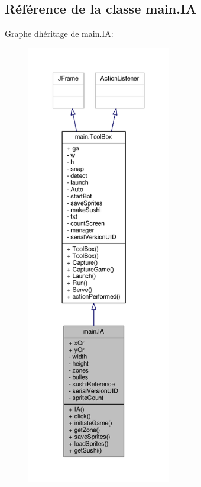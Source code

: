 \hypertarget{classmain_1_1IA}{}\subsection{Référence de la classe main.\+I\+A}
\label{classmain_1_1IA}


Graphe d\textquotesingle{}héritage de main.\+I\+A\+:\nopagebreak
\begin{figure}[H]
\begin{center}
\leavevmode
\includegraphics[height=550pt]{classmain_1_1IA__inherit__graph}
\end{center}
\end{figure}


